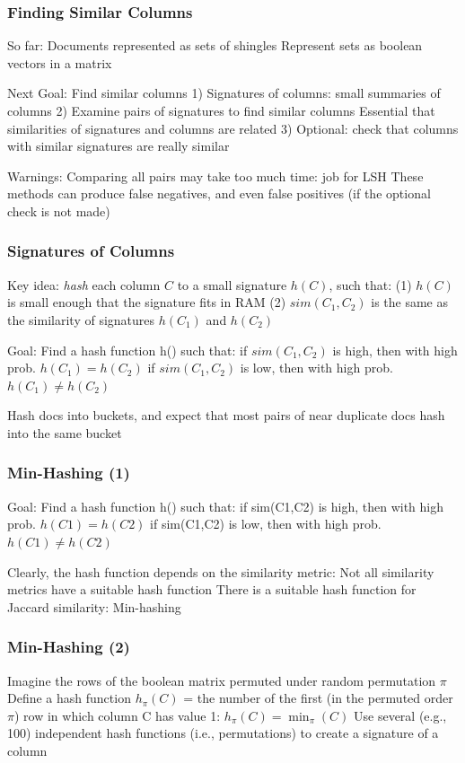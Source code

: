 \documentclass[svgnames]{beamer}
\begin{document}
  
\begin{frame} \frametitle{Finding Similar Columns}
So far:
  Documents represented as sets of shingles
  Represent sets as boolean vectors in a matrix

Next Goal: Find similar columns
 1) Signatures of columns: small summaries of columns
 2) Examine pairs of signatures to find similar columns 
       Essential that similarities of signatures and columns are related
 3) Optional: check that columns with similar signatures are really similar

Warnings:
  Comparing all pairs may take too much time: job for LSH
  These methods can produce false negatives, and even false positives (if the optional check is not made)
  \end{frame}

  
\begin{frame} \frametitle{Signatures of Columns}

Key idea: \emph{hash} each column $C$ to a small signature $h(C)$, such that:
  (1) $h(C)$ is small enough that the signature fits in RAM
  (2) $sim(C_1, C_2)$ is the same as the similarity of signatures $h(C_1)$ and $h(C_2)$

Goal: Find a hash function h() such that:
  if $sim(C_1,C_2)$ is high, then with high prob. $h(C_1) = h(C_2)$
  if $sim(C_1,C_2)$ is low, then with high prob. $h(C_1) \neq h(C_2)$

Hash docs into buckets, and expect that most pairs of near duplicate docs hash into the same bucket
\end{frame}

  
\begin{frame} \frametitle{Min-Hashing (1)}

Goal: Find a hash function h() such that:
  if sim(C1,C2) is high, then with high prob. $h(C1) = h(C2)$
  if sim(C1,C2) is low, then with high prob. $h(C1) \neq h(C2)$

Clearly, the hash function depends on the similarity metric:
  Not all similarity metrics have a suitable hash function
  There is a suitable hash function for Jaccard similarity: Min-hashing
  
\end{frame}

  
\begin{frame} \frametitle{Min-Hashing (2)}

Imagine the rows of the boolean matrix permuted under random permutation $\pi$
Define a hash function $h_\pi(C)$ = the number of the first (in the permuted order $\pi$) row in which column C has value 1:
  $h_\pi (C) = \min_\pi(C)$
Use several (e.g., 100) independent hash functions (i.e., permutations) to create a signature of a column

\end{frame}
\end{document}
